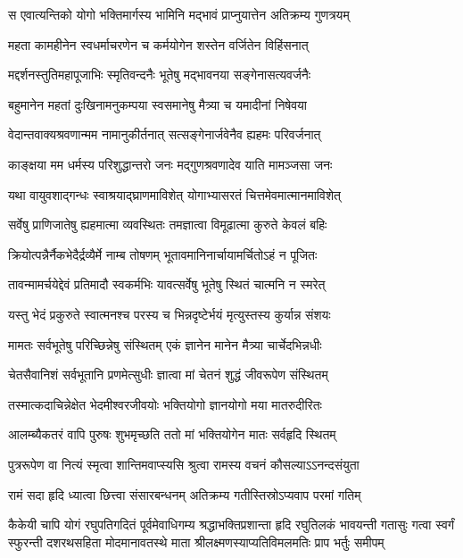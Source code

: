 \twolineshloka
{स एवात्यन्तिको योगो भक्तिमार्गस्य भामिनि}
{मद्भावं प्राप्नुयात्तेन अतिक्रम्य गुणत्रयम्} %

\twolineshloka
{महता कामहीनेन स्वधर्माचरणेन च}
{कर्मयोगेन शस्तेन वर्जितेन विहिंसनात्} %

\twolineshloka
{मद्दर्शनस्तुतिमहापूजाभिः स्मृतिवन्दनैः}
{भूतेषु मद्भावनया सङ्गेनासत्यवर्जनैः} %

\twolineshloka
{बहुमानेन महतां दुःखिनामनुकम्पया}
{स्वसमानेषु मैत्र्या च यमादीनां निषेवया} %

\twolineshloka
{वेदान्तवाक्यश्रवणान्मम नामानुकीर्तनात्}
{सत्सङ्गेनार्जवेनैव ह्यहमः परिवर्जनात्} %

\twolineshloka
{काङ्क्षया मम धर्मस्य परिशुद्धान्तरो जनः}
{मद्गुणश्रवणादेव याति मामञ्जसा जनः} %

\twolineshloka
{यथा वायुवशाद्गन्धः स्वाश्रयाद्घ्राणमाविशेत्}
{योगाभ्यासरतं चित्तमेवमात्मानमाविशेत्} %

\twolineshloka
{सर्वेषु प्राणिजातेषु ह्यहमात्मा व्यवस्थितः}
{तमज्ञात्वा विमूढात्मा कुरुते केवलं बहिः} %

\twolineshloka
{क्रियोत्पन्नैर्नैकभेदैर्द्रव्यैर्मे नाम्ब तोषणम्}
{भूतावमानिनार्चायामर्चितोऽहं न पूजितः} %

\twolineshloka
{तावन्मामर्चयेद्देवं प्रतिमादौ स्वकर्मभिः}
{यावत्सर्वेषु भूतेषु स्थितं चात्मनि न स्मरेत्} %

\twolineshloka
{यस्तु भेदं प्रकुरुते स्वात्मनश्च परस्य च}
{भिन्नदृष्टेर्भयं मृत्युस्तस्य कुर्यान्न संशयः} %

\twolineshloka
{मामतः सर्वभूतेषु परिच्छिन्नेषु संस्थितम्}
{एकं ज्ञानेन मानेन मैत्र्या चार्चेदभिन्नधीः} %

\twolineshloka
{चेतसैवानिशं सर्वभूतानि प्रणमेत्सुधीः}
{ज्ञात्वा मां चेतनं शुद्धं जीवरूपेण संस्थितम्} %

\twolineshloka
{तस्मात्कदाचिन्नेक्षेत भेदमीश्वरजीवयोः}
{भक्तियोगो ज्ञानयोगो मया मातरुदीरितः} %

\twolineshloka
{आलम्ब्यैकतरं वापि पुरुषः शुभमृच्छति}
{ततो मां भक्तियोगेन मातः सर्वहृदि स्थितम्} %

\twolineshloka
{पुत्ररूपेण वा नित्यं स्मृत्वा शान्तिमवाप्स्यसि}
{श्रुत्वा रामस्य वचनं कौसल्याऽऽनन्दसंयुता} %

\twolineshloka
{रामं सदा हृदि ध्यात्वा छित्त्वा संसारबन्धनम्}
{अतिक्रम्य गतीस्तिस्रोऽप्यवाप परमां गतिम्} %

\fourlineindentedshloka
{कैकेयी चापि योगं रघुपतिगदितं पूर्वमेवाधिगम्य}
{श्रद्धाभक्तिप्रशान्ता हृदि रघुतिलकं भावयन्ती गतासुः}
{गत्वा स्वर्गं स्फुरन्ती दशरथसहिता मोदमानावतस्थे}
{माता श्रीलक्ष्मणस्याप्यतिविमलमतिः प्राप भर्तुः समीपम्} %

